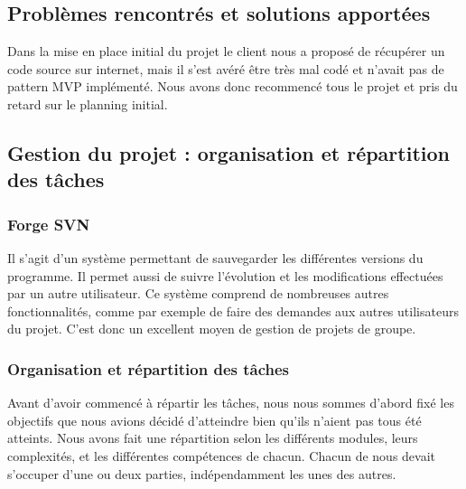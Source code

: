 \documentclass[a4paper,12pt]{article} %
\begin{document}
\subsection{Problèmes rencontrés et solutions apportées}
Dans la mise en place initial du projet le client nous a proposé de récupérer un code source sur internet, mais il s'est avéré être très mal codé et n'avait pas de pattern MVP implémenté.
\newline
Nous avons donc recommencé tous le projet et pris du retard sur le planning initial.


\subsection{Gestion du projet : organisation et répartition des tâches}
\subsubsection{Forge SVN}

Il s’agit d’un système permettant de sauvegarder les différentes versions du programme.
\newline
 Il permet aussi de suivre l’évolution et les modifications effectuées par un autre utilisateur. Ce système comprend de nombreuses autres fonctionnalités, comme par exemple de faire des demandes aux autres utilisateurs du projet.
\newline
C’est donc un excellent moyen de gestion de projets de groupe.
\subsubsection{Organisation et répartition des tâches}
Avant d’avoir commencé à répartir les tâches, nous  nous sommes d’abord fixé les objectifs que nous avions décidé d'atteindre bien qu’ils n'aient pas tous été atteints.
\newline\newline  
Nous avons fait une répartition selon les différents modules, leurs complexités, et les différentes compétences de chacun.
\newline\newline  
Chacun de nous devait s’occuper d’une ou deux parties, indépendamment les unes des autres.
\newpage
\end{document}
